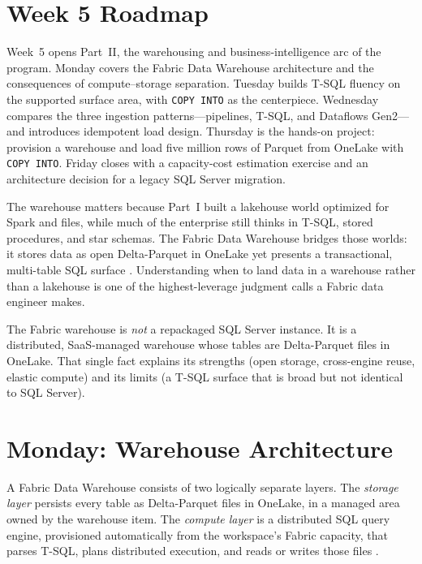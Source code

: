 \section{Week 5 Roadmap}
Week~5 opens Part~II, the warehousing and business-intelligence arc of the program. Monday covers the Fabric Data Warehouse architecture and the consequences of compute--storage separation. Tuesday builds T-SQL fluency on the supported surface area, with \texttt{COPY INTO} as the centerpiece. Wednesday compares the three ingestion patterns---pipelines, T-SQL, and Dataflows Gen2---and introduces idempotent load design. Thursday is the hands-on project: provision a warehouse and load five million rows of Parquet from OneLake with \texttt{COPY INTO}. Friday closes with a capacity-cost estimation exercise and an architecture decision for a legacy SQL Server migration.

The warehouse matters because Part~I built a lakehouse world optimized for Spark and files, while much of the enterprise still thinks in T-SQL, stored procedures, and star schemas. The Fabric Data Warehouse bridges those worlds: it stores data as open Delta-Parquet in OneLake yet presents a transactional, multi-table SQL surface \cite{microsoftFabricWarehouse}. Understanding when to land data in a warehouse rather than a lakehouse is one of the highest-leverage judgment calls a Fabric data engineer makes.

\begin{notebox}
The Fabric warehouse is \emph{not} a repackaged SQL Server instance. It is a distributed, SaaS-managed warehouse whose tables are Delta-Parquet files in OneLake. That single fact explains its strengths (open storage, cross-engine reuse, elastic compute) and its limits (a T-SQL surface that is broad but not identical to SQL Server).
\end{notebox}

\section{Monday: Warehouse Architecture}
A Fabric Data Warehouse consists of two logically separate layers. The \emph{storage layer} persists every table as Delta-Parquet files in OneLake, in a managed area owned by the warehouse item. The \emph{compute layer} is a distributed SQL query engine, provisioned automatically from the workspace's Fabric capacity, that parses T-SQL, plans distributed execution, and reads or writes those files \cite{microsoftFabricWarehouse}.

